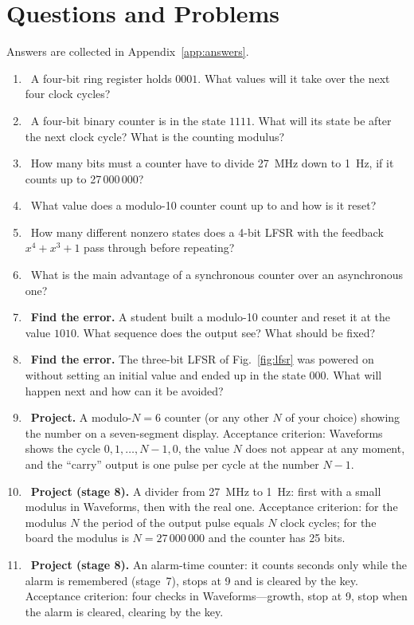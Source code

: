 \section{Questions and Problems}
\label{sec:tasks-regs}

Answers are collected in Appendix~\ref{app:answers}.

\begin{taskbox}
\begin{enumerate}
  \item {}~A four-bit ring register holds $0001$. What values will it take over the next four clock cycles?
  \item {}~A four-bit binary counter is in the state $1111$. What will its state be after the next clock cycle? What is the counting modulus?
  \item {}~How many bits must a counter have to divide 27~MHz down to 1~Hz, if it counts up to 27\,000\,000?
  \item {}~What value does a modulo-10 counter count up to and how is it reset?
  \item {}~How many different nonzero states does a 4-bit LFSR with the feedback $x^4 + x^3 + 1$ pass through before repeating?
  \item {}~What is the main advantage of a synchronous counter over an asynchronous one?
  \item {}~\textbf{Find the error.} A student built a modulo-10 counter and reset it at the value $1010$. What sequence does the output see? What should be fixed?
  \item {}~\textbf{Find the error.} The three-bit LFSR of Fig.~\ref{fig:lfsr} was powered on without setting an initial value and ended up in the state $000$. What will happen next and how can it be avoided?
  \item {}~\textbf{Project.} A modulo-$N=6$ counter (or any other $N$ of your choice) showing the number on a seven-segment display. Acceptance criterion: Waveforms shows the cycle $0,1,\ldots,N-1,0$, the value $N$ does not appear at any moment, and the ``carry'' output is one pulse per cycle at the number $N-1$.
  \item {}~\textbf{Project (stage 8).} A divider from 27~MHz to 1~Hz: first with a small modulus in Waveforms, then with the real one. Acceptance criterion: for the modulus $N$ the period of the output pulse equals $N$ clock cycles; for the board the modulus is $N=27\,000\,000$ and the counter has 25 bits.
  \item {}~\textbf{Project (stage 8).} An alarm-time counter: it counts seconds only while the alarm is remembered (stage~7), stops at 9 and is cleared by the key. Acceptance criterion: four checks in Waveforms---growth, stop at 9, stop when the alarm is cleared, clearing by the key.
\end{enumerate}
\end{taskbox}

